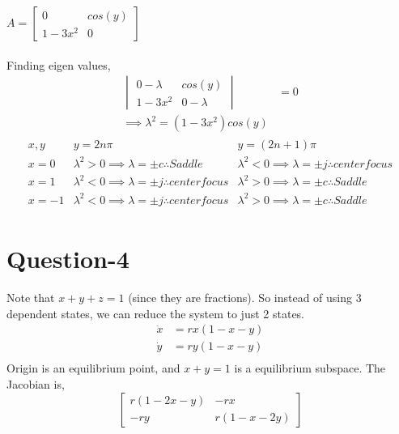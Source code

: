 \documentclass{article}
\begin{document}
$A = \begin{bmatrix} 0 & cos(y) \\ 1-3x^2 & 0\end{bmatrix} $ \\
\\
Finding eigen values,
\begin{align*}
    \begin{vmatrix} 0-\lambda & cos(y) \\ 1-3x^2 & 0-\lambda\end{vmatrix} &= 0 \\
    \implies \lambda^2 = (1 - 3x^2)cos(y)
\end{align*}
\begin{align}
    \begin{array}{|c|c|c|}
    \hline
    x,y    & y = 2n\pi  & y = (2n+1)\pi   \\
    \hline
    x = 0  & \lambda^2 >0 \implies \lambda = \pm c \therefore Saddle & \lambda^2 < 0 \implies \lambda = \pm j \therefore  center focus \\
    x = 1  & \lambda^2 < 0 \implies \lambda = \pm j \therefore  center focus & \lambda^2 >0 \implies \lambda = \pm c \therefore Saddle        \\
    x = -1 & \lambda^2 < 0 \implies \lambda = \pm j \therefore  center focus  & \lambda^2 >0 \implies \lambda = \pm c \therefore Saddle  
    \end{array}
\end{align}

\section*{Question-4}
Note that $x  + y + z = 1$ (since they are fractions). So instead of using 3 dependent states, we can reduce the system to just 2 states.
\begin{align}
    \dot{x} &= rx(1-x-y) \\
    \dot{y} &= ry(1-x-y) \\
\end{align}
Origin is an equilibrium point, and $x+y=1$ is a equilibrium subspace. The Jacobian is,
\begin{equation}
    \begin{bmatrix} r(1-2x-y) & -rx \\ -ry & r(1-x-2y) \end{bmatrix}
\end{equation}
\end{document}

